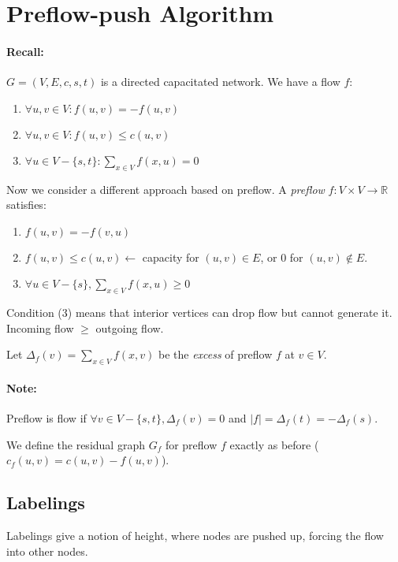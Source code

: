 \section{Preflow-push Algorithm}

\paragraph{Recall:} $G=(V,E,c,s,t)$ is a directed capacitated network. We have a flow $f$:

\begin{enumerate}
\item $\forall u,v \in V: f(u,v) = - f(u,v)$
\item $\forall u,v \in V: f(u,v) \le c(u,v)$
\item $\forall u\in V - \{s,t\}: \sum_{x \in V} f(x,u) = 0$
\end{enumerate}

Now we consider a different approach based on preflow. A \emph{preflow} $f: V \times V \rightarrow \mathbb{R}$ satisfies:
\begin{enumerate}
\item $f(u,v) = - f(v,u)$
\item $f(u,v) \le c(u,v) \gets$ capacity for $(u,v) \in E$, or $0$ for $(u,v) \notin E$.
\item $\forall u \in V - \{s\}, \sum_{x \in V} f(x,u) \ge 0$
\end{enumerate}

Condition (3) means that interior vertices can drop flow but cannot generate it. Incoming flow $\ge$ outgoing flow.

Let $\Delta_f(v) = \sum_{x \in V} f(x,v)$ be the \emph{excess} of preflow $f$ at $v \in V$.

\paragraph{Note:} Preflow is flow if $\forall v \in V - \{s,t\}, \Delta_f(v) = 0$ and $|f| = \Delta_f(t) = -\Delta_f(s)$.

\bigskip 

We define the residual graph $G_f$ for preflow $f$ exactly as before ($c_f(u,v) = c(u,v) - f(u,v)$).

\subsection{Labelings}

Labelings give a notion of height, where nodes are pushed up, forcing the flow into other nodes.

